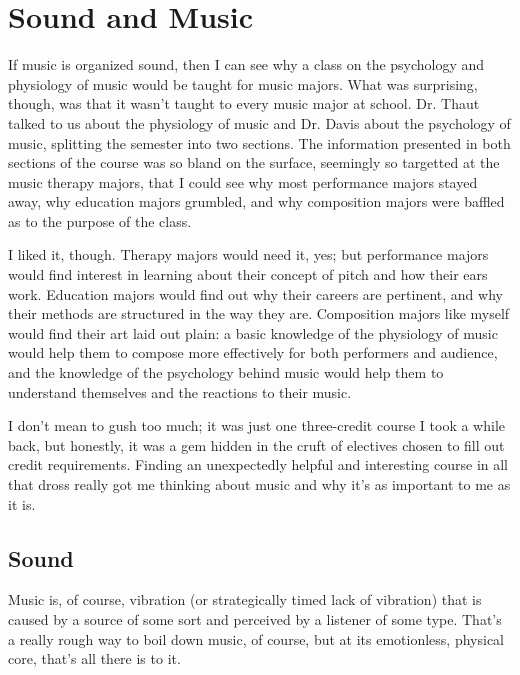 \documentclass{book}
\begin{document}
\mainmatter

\chapter{Sound and Music}
If music is organized sound, then I can see why a class on the psychology and physiology of music would be taught for music majors.  What was surprising, though, was that it wasn't taught to every music major at school.  Dr. Thaut talked to us about the physiology of music and Dr. Davis about the psychology of music, splitting the semester into two sections.  The information presented in both sections of the course was so bland on the surface, seemingly so targetted at the music therapy majors, that I could see why most performance majors stayed away, why education majors grumbled, and why composition majors were baffled as to the purpose of the class.

I liked it, though.  Therapy majors would need it, yes; but performance majors would find interest in learning about their concept of pitch and how their ears work.  Education majors would find out why their careers are pertinent, and why their methods are structured in the way they are.  Composition majors like myself would find their art laid out plain: a basic knowledge of the physiology of music would help them to compose more effectively for both performers and audience, and the knowledge of the psychology behind music would help them to understand themselves and the reactions to their music.

I don't mean to gush too much; it was just one three-credit course I took a while back, but honestly, it was a gem hidden in the cruft of electives chosen to fill out credit requirements.  Finding an unexpectedly helpful and interesting course in all that dross really got me thinking about music and why it's as important to me as it is.

\section{Sound}
Music is, of course, vibration (or strategically timed lack of vibration) that is caused by a source of some sort and perceived by a listener of some type.  That's a really rough way to boil down music, of course, but at its emotionless, physical core, that's all there is to it.
\end{document}
